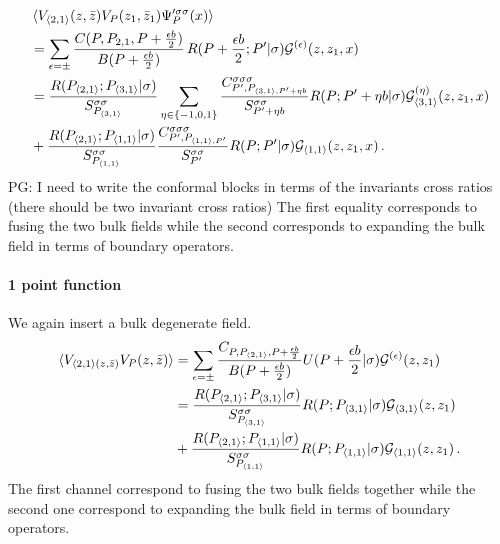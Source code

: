 \documentclass[a4paper]{article}
\newcommand{\purple}[1]{{\color{purple} #1 \color{black}}}
\newcommand{\PG}[1]{{\purple{PG: #1}}} %
\begin{document}
\begin{equation}
  \begin{aligned}
    &\braket{V_{\braket{2,1}}(z,\bar{z})V_{P}(z_1,\bar{z}_1)\Psi_P'^{\sigma \sigma }(x)}\\
    &=\sum_{\epsilon = \pm} \frac{C(P,P_{2,1},P+\frac{\epsilon b}{2})}{B(P+\frac{\epsilon b}{2})}\,R(P+\frac{\epsilon b }{2};P'|\sigma) \mathcal{G}^{(\epsilon)}(z,z_1,x)\\
    &=\frac{R(P_{\braket{2,1}};P_{\braket{3,1}}|\sigma)}{S_{P_{\braket{3,1}}}^{\sigma \sigma}} \sum_{\eta \in \{-1,0,1\}}\frac{C_{P',P_{\braket{3,1},P'+\eta b}}^{\sigma \sigma \sigma }}{S_{P'+\eta b}^{\sigma \sigma}}R(P;P'+\eta b|\sigma)\mathcal{G}_{\braket{3,1}}^{(\eta)}(z,z_1,x)\\
    &+\frac{R(P_{\braket{2,1}};P_{\braket{1,1}}|\sigma)}{S_{P_{\braket{1,1}}}^{\sigma \sigma}} \frac{C_{P',P_{\braket{1,1},P'}}^{\sigma \sigma \sigma }}{S_{P'}^{\sigma \sigma}}R(P;P'|\sigma)\mathcal{G}_{\braket{1,1}}(z,z_1,x)\,.
  \end{aligned}
\end{equation}
\PG{I need to write the conformal blocks in terms of the invariants cross ratios (there should be two invariant cross ratios)}
The first equality corresponds to fusing the two bulk fields while the second corresponds to expanding the bulk field in terms of boundary operators.

\paragraph{1 point function}
We again insert a bulk degenerate field.
\begin{equation}
  \begin{aligned}
    \braket{V_{\braket{2,1}(z,\bar{z})}V_{P}(z,\bar{z})}
    &=\sum_{\epsilon = \pm} \frac{C_{P,P_{\braket{2,1}},P+\frac{\epsilon b }{2}}}{B(P+\frac{\epsilon b}{2})} U(P+\frac{\epsilon b}{2}|\sigma) \mathcal{G}^{(\epsilon)}(z,z_1)\\
    &=\frac{R(P_{\braket{2,1}};P_{\braket{3,1}}|\sigma)}{S_{P_{\braket{3,1}}}^{\sigma \sigma}} R(P;P_{\braket{3,1}}|\sigma)\mathcal{G}_{\braket{3,1}}(z,z_1)\\
    &+\frac{R(P_{\braket{2,1}};P_{\braket{1,1}}|\sigma)}{S_{P_{\braket{1,1}}}^{\sigma \sigma}}R(P;P_{\braket{1,1}}|\sigma)\mathcal{G}_{\braket{1,1}}(z,z_1)\,.
  \end{aligned}
\end{equation}
The first channel correspond to fusing the two bulk fields together while the second one correspond to expanding the bulk field in terms of boundary operators. 
\end{document}
